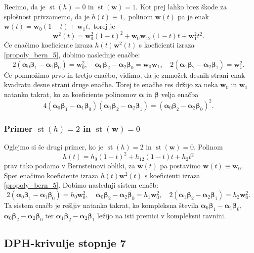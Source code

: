 \documentclass[12pt,a4paper,twoside]{article}
\theoremstyle{definition} %
\theoremstyle{plain} %
\theoremstyle{primerstyle}
\numberwithin{equation}{section}  %
\newcommand{\wV}{\mathbf{w}}
\newcommand{\balpha}{\boldsymbol \alpha}
\newcommand{\bbeta}{\boldsymbol \beta}
\DeclareMathOperator{\st}{st}
\begin{document}
Recimo, da je $\st(h)=0$ in $\st(\wV)=1.$ Kot prej lahko brez škode za splošnost privzamemo, da je $h(t)\equiv1,$ polinom $\wV(t)$ pa je enak $\wV(t)=\wV_0(1-t)+\wV_1t,$ torej je $$\wV^2(t)=\wV_0^2(1-t)^2+\wV_0\wV_12(1-t)t+\wV_1^2t^2.$$ Če enačimo koeficiente izraza $h(t)\wV^2(t)$ s koeficienti izraza \eqref{propoly_bern_5}, dobimo naslednje enačbe:
\begin{equation}
	2(\balpha_0\bbeta_1-\balpha_1\bbeta_0)=\wV_0^2,\quad \balpha_0\bbeta_2-\balpha_2\bbeta_0=\wV_0\wV_1,\quad 2(\balpha_1\bbeta_2-\balpha_2\bbeta_1)=\wV_1^2.
\end{equation}
Če pomnožimo prvo in tretjo enačbo, vidimo, da je zmnožek desnih strani enak kvadratu desne strani druge enačbe. Torej te enačbe res držijo za neka $\wV_0$ in $\wV_1$ natanko takrat, ko za koeficiente polinomov $\balpha$ in $\bbeta$ velja enačba
\begin{equation}
	\label{st5h0w1}
	4(\balpha_0\bbeta_1-\balpha_1\bbeta_0)(\balpha_1\bbeta_2-\balpha_2\bbeta_1)=(\balpha_0\bbeta_2-\balpha_2\bbeta_0)^2.
\end{equation}

\subsubsection{Primer \texorpdfstring{$\st(h)=2$}{st(h)=2} in \texorpdfstring{$\st(\wV)=0$}{st(w)=0}}

Oglejmo si še drugi primer, ko je $\st(h)=2$ in $\st(\wV)=0.$ Polinom $$h(t)=h_0(1-t)^2+h_12(1-t)t+h_2t^2$$ prav tako podamo v Bernsteinovi obliki, za $\wV(t)$ pa postavimo $\wV(t)\equiv\wV_0.$ Spet enačimo koeficiente izraza $h(t)\wV^2(t)$ s koeficienti izraza \eqref{propoly_bern_5}. Dobimo naslednji sistem enačb:
\begin{equation}
	2(\balpha_0\bbeta_1-\balpha_1\bbeta_0)=h_0\wV_0^2,\quad \balpha_0\bbeta_2-\balpha_2\bbeta_0=h_1\wV_0^2,\quad 2(\balpha_1\bbeta_2-\balpha_2\bbeta_1)=h_2\wV_0^2.\label{st5h2w0}
\end{equation}
Ta sistem enačb je rešljiv natanko takrat, ko kompleksna števila $\balpha_0\bbeta_1-\balpha_1\bbeta_0,$ $\balpha_0\bbeta_2-\balpha_2\bbeta_0$ ter $\balpha_1\bbeta_2-\balpha_2\bbeta_1$ ležijo na isti premici v kompleksni ravnini.

\subsection{DPH-krivulje stopnje 7}
\label{poglavje_dvojnePHkrivulje7}
\end{document}
